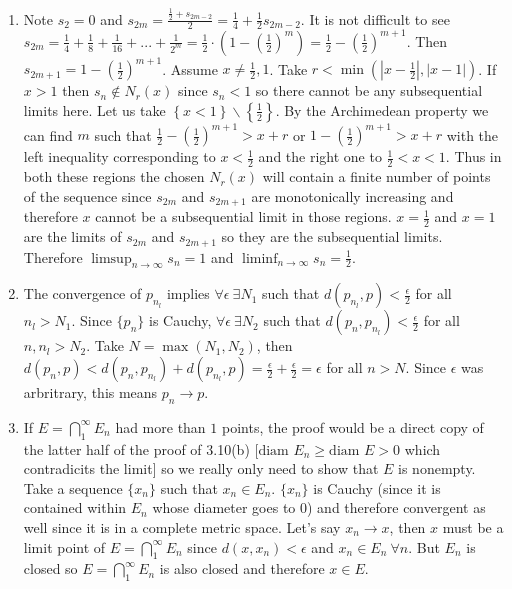 \documentclass{article}
\begin{document}
\begin{enumerate}
\item Note $s_{2}=0$ and $s_{2m} = \displaystyle\frac{\frac{1}{2}+s_{2m-2}}{2}=\frac{1}{4}+\frac{1}{2}s_{2m-2}$. It is not difficult to see $\displaystyle s_{2m}=\frac{1}{4}+\frac{1}{8}+\frac{1}{16}+...+\frac{1}{2^m}=\frac{1}{2}\cdot\left(1-\left(\frac{1}{2}\right)^{m}\right)=\frac{1}{2}-\left(\frac{1}{2}\right)^{m+1}$. Then $s_{2m+1}=\displaystyle 1-\left(\frac{1}{2}\right)^{m+1}$. Assume $x\neq\frac{1}{2}, 1$. Take $r<\min (|x-\frac{1}{2}|, |x-1|)$. If $x>1$ then $s_n\notin N_r (x)$ since $s_n < 1$ so there cannot be any subsequential limits here. Let us take $\left\{x<1\right\}\backslash \left\{\frac{1}{2}\right\}$. By the Archimedean property we can find $m$ such that $\frac{1}{2}-\left(\frac{1}{2}\right)^{m+1} > x+r $	or $1-\left(\frac{1}{2}\right)^{m+1} > x+r $ with the left inequality corresponding to $x<\frac{1}{2}$ and the right one to $\frac{1}{2}<x<1$. Thus in both these regions the chosen $N_r (x)$ will contain a finite number of points of the sequence since $s_{2m}$ and $s_{2m+1}$ are monotonically increasing and therefore $x$ cannot be a subsequential limit in those regions. $x=\frac{1}{2}$ and $x=1$ are the limits of $s_{2m}$ and $s_{2m+1}$ so they are the subsequential limits. Therefore $\displaystyle\limsup_{n\rightarrow\infty} s_n = 1$ and $\displaystyle\liminf_{n\rightarrow\infty} s_n = \frac{1}{2}$.
\\
\setcounter{enumi}{19}
\item  The convergence of $p_{n_l}$ implies $\forall \epsilon \ \exists N_1$ such that $d(p_{n_l}, p)<\frac{\epsilon}{2}$ for all $n_l>N_1$. Since $\{p_n\}$ is Cauchy, $\forall \epsilon \ \exists N_2$ such that $d(p_n, p_{n_l})<\frac{\epsilon}{2}$ for all $n, n_l > N_2$. Take $N=\max(N_1, N_2)$, then $d(p_n, p) < d(p_n, p_{n_l}) + d(p_{n_l}, p) = \frac{\epsilon}{2}+\frac{\epsilon}{2}=\epsilon$ for all $n>N$. Since $\epsilon$ was arbritrary, this means $p_n \rightarrow p$. 
\\
\item If $E=\bigcap_{1}^\infty E_n$ had more than $1$ points, the proof would be a direct copy of the latter half of the proof of 3.10(b) [$\text{diam } E_n \geq \text{diam } E > 0$ which contradicits the limit] so we really only need to show that $E$ is nonempty. Take a sequence $\{x_n\}$ such that $x_n\in E_n$. $\{x_n\}$ is Cauchy (since it is contained within $E_n$ whose diameter goes to 0) and therefore convergent as well since it is in a complete metric space. Let's say $x_n \rightarrow x$, then $x$ must be a limit point of $E=\bigcap_{1}^\infty E_n$ since $d(x, x_n) < \epsilon$ and $x_n \in E_n \ \forall n$. But $E_n$ is closed so $E=\bigcap_{1}^\infty E_n$ is also closed and therefore $x\in E$.

\end{enumerate}
\end{document}
